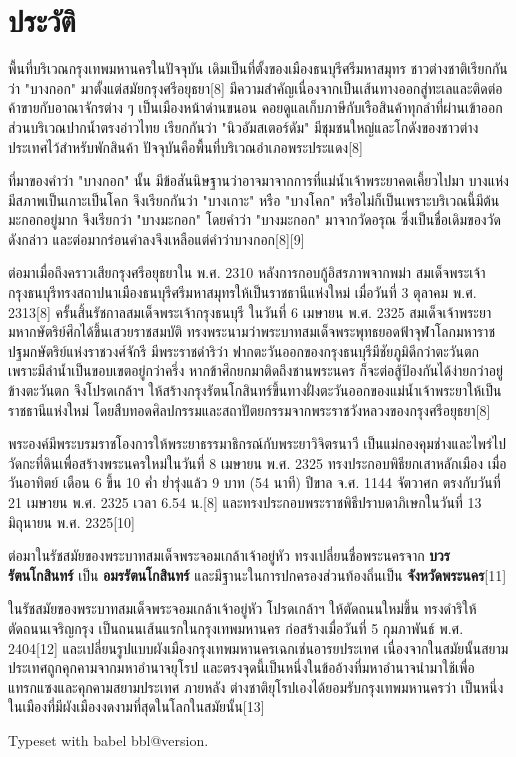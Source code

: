 \documentclass[twocolumn]{article}
\begin{document}
\section{ประวัติ}

พื้นที่บริเวณกรุงเทพมหานครในปัจจุบัน เดิมเป็นที่ตั้งของเมืองธนบุรีศรีมหาสมุทร ชาวต่างชาติเรียกกันว่า "บางกอก" มาตั้งแต่สมัยกรุงศรีอยุธยา[8] มีความสำคัญเนื่องจากเป็นเส้นทางออกสู่ทะเลและติดต่อค้าขายกับอาณาจักรต่าง ๆ เป็นเมืองหน้าด่านขนอน คอยดูแลเก็บภาษีกับเรือสินค้าทุกลำที่ผ่านเข้าออก ส่วนบริเวณปากน้ำตรงอ่าวไทย เรียกกันว่า "นิวอัมสเตอร์ดัม" มีชุมชนใหญ่และโกดังของชาวต่างประเทศไว้สำหรับพักสินค้า ปัจจุบันคือพื้นที่บริเวณอำเภอพระประแดง[8]

ที่มาของคำว่า "บางกอก" นั้น มีข้อสันนิษฐานว่าอาจมาจากการที่แม่น้ำเจ้าพระยาคดเคี้ยวไปมา บางแห่งมีสภาพเป็นเกาะเป็นโคก จึงเรียกกันว่า "บางเกาะ" หรือ "บางโคก" หรือไม่ก็เป็นเพราะบริเวณนี้มีต้นมะกอกอยู่มาก จึงเรียกว่า "บางมะกอก" โดยคำว่า "บางมะกอก" มาจากวัดอรุณ ซึ่งเป็นชื่อเดิมของวัดดังกล่าว และต่อมากร่อนคำลงจึงเหลือแต่คำว่าบางกอก[8][9]

ต่อมาเมื่อถึงคราวเสียกรุงศรีอยุธยาใน พ.ศ. 2310 หลังการกอบกู้อิสรภาพจากพม่า สมเด็จพระเจ้ากรุงธนบุรีทรงสถาปนาเมืองธนบุรีศรีมหาสมุทรให้เป็นราชธานีแห่งใหม่ เมื่อวันที่ 3 ตุลาคม พ.ศ. 2313[8] ครั้นสิ้นรัชกาลสมเด็จพระเจ้ากรุงธนบุรี ในวันที่ 6 เมษายน พ.ศ. 2325 สมเด็จเจ้าพระยามหากษัตริย์ศึกได้ขึ้นเสวยราชสมบัติ ทรงพระนามว่าพระบาทสมเด็จพระพุทธยอดฟ้าจุฬาโลกมหาราช ปฐมกษัตริย์แห่งราชวงศ์จักรี มีพระราชดำริว่า ฟากตะวันออกของกรุงธนบุรีมีชัยภูมิดีกว่าตะวันตก เพราะมีลำน้ำเป็นขอบเขตอยู่กว่าครึ่ง หากข้าศึกยกมาติดถึงชานพระนคร ก็จะต่อสู้ป้องกันได้ง่ายกว่าอยู่ข้างตะวันตก จึงโปรดเกล้าฯ ให้สร้างกรุงรัตนโกสินทร์ขึ้นทางฝั่งตะวันออกของแม่น้ำเจ้าพระยาให้เป็นราชธานีแห่งใหม่ โดยสืบทอดศิลปกรรมและสถาปัตยกรรมจากพระราชวังหลวงของกรุงศรีอยุธยา[8]

พระองค์มีพระบรมราชโองการให้พระยาธรรมาธิกรณ์กับพระยาวิจิตรนาวี เป็นแม่กองคุมช่างและไพร่ไปวัดกะที่ดินเพื่อสร้างพระนครใหม่ในวันที่ 8 เมษายน พ.ศ. 2325 ทรงประกอบพิธียกเสาหลักเมือง เมื่อวันอาทิตย์ เดือน 6 ขึ้น 10 ค่ำ ย่ำรุ่งแล้ว 9 บาท (54 นาที) ปีขาล จ.ศ. 1144 จัตวาศก ตรงกับวันที่ 21 เมษายน พ.ศ. 2325 เวลา 6.54 น.[8] และทรงประกอบพระราชพิธีปราบดาภิเษกในวันที่ 13 มิถุนายน พ.ศ. 2325[10]

ต่อมาในรัชสมัยของพระบาทสมเด็จพระจอมเกล้าเจ้าอยู่หัว ทรงเปลี่ยนชื่อพระนครจาก \textbf{บวรรัตนโกสินทร์} เป็น \textbf{อมรรัตนโกสินทร์} และมีฐานะในการปกครองส่วนท้องถิ่นเป็น \textbf{จังหวัดพระนคร}[11]

ในรัชสมัยของพระบาทสมเด็จพระจอมเกล้าเจ้าอยู่หัว โปรดเกล้าฯ ให้ตัดถนนใหม่ขึ้น ทรงดำริให้ตัดถนนเจริญกรุง เป็นถนนเส้นแรกในกรุงเทพมหานคร ก่อสร้างเมื่อวันที่ 5 กุมภาพันธ์ พ.ศ. 2404[12] และเปลี่ยนรูปแบบผังเมืองกรุงเทพมหานครเฉกเช่นอารยประเทศ เนื่องจากในสมัยนั้นสยามประเทศถูกคุกคามจากมหาอำนาจยุโรป และตรงจุดนี้เป็นหนึ่งในข้ออ้างที่มหาอำนาจนำมาใช้เพื่อแทรกแซงและคุกคามสยามประเทศ ภายหลัง ต่างชาติยุโรปเองได้ยอมรับกรุงเทพมหานครว่า เป็นหนึ่งในเมืองที่มีผังเมืองงดงามที่สุดในโลกในสมัยนั้น[13]

\bigskip

Typeset with babel \csname bbl@version\endcsname.
\end{document}
